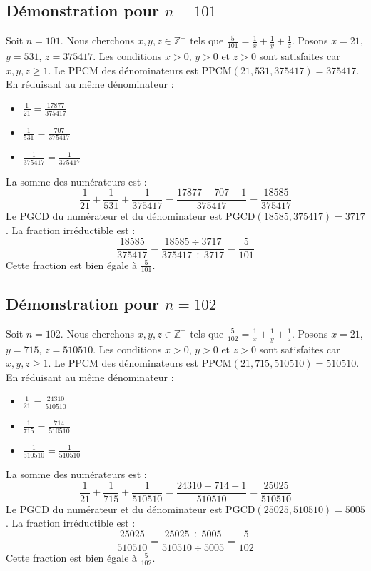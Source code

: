 \documentclass[11pt,a4paper]{article}
\begin{document}
\subsection{Démonstration pour $n = 101$}
Soit $n = 101$. Nous cherchons $x, y, z \in \mathbb{Z}^{+}$ tels que $\frac{5}{101} = \frac{1}{x} + \frac{1}{y} + \frac{1}{z}$.
Posons $x = 21$, $y = 531$, $z = 375417$.
Les conditions $x > 0$, $y > 0$ et $z > 0$ sont satisfaites car $x, y, z \geq 1$.
Le PPCM des dénominateurs est $\text{PPCM}(21, 531, 375417) = 375417$.
En réduisant au même dénominateur :
\begin{itemize}
    \item $\frac{1}{21} = \frac{17877}{375417}$
    \item $\frac{1}{531} = \frac{707}{375417}$
    \item $\frac{1}{375417} = \frac{1}{375417}$
\end{itemize}
La somme des numérateurs est :
$$ \frac{1}{21} + \frac{1}{531} + \frac{1}{375417} = \frac{17877 + 707 + 1}{375417} = \frac{18585}{375417} $$
Le PGCD du numérateur et du dénominateur est $\text{PGCD}(18585, 375417) = 3717$.
La fraction irréductible est :
$$ \frac{18585}{375417} = \frac{18585 \div 3717}{375417 \div 3717} = \frac{5}{101} $$
Cette fraction est bien égale à $\frac{5}{101}$.

\subsection{Démonstration pour $n = 102$}
Soit $n = 102$. Nous cherchons $x, y, z \in \mathbb{Z}^{+}$ tels que $\frac{5}{102} = \frac{1}{x} + \frac{1}{y} + \frac{1}{z}$.
Posons $x = 21$, $y = 715$, $z = 510510$.
Les conditions $x > 0$, $y > 0$ et $z > 0$ sont satisfaites car $x, y, z \geq 1$.
Le PPCM des dénominateurs est $\text{PPCM}(21, 715, 510510) = 510510$.
En réduisant au même dénominateur :
\begin{itemize}
    \item $\frac{1}{21} = \frac{24310}{510510}$
    \item $\frac{1}{715} = \frac{714}{510510}$
    \item $\frac{1}{510510} = \frac{1}{510510}$
\end{itemize}
La somme des numérateurs est :
$$ \frac{1}{21} + \frac{1}{715} + \frac{1}{510510} = \frac{24310 + 714 + 1}{510510} = \frac{25025}{510510} $$
Le PGCD du numérateur et du dénominateur est $\text{PGCD}(25025, 510510) = 5005$.
La fraction irréductible est :
$$ \frac{25025}{510510} = \frac{25025 \div 5005}{510510 \div 5005} = \frac{5}{102} $$
Cette fraction est bien égale à $\frac{5}{102}$.
\end{document}
